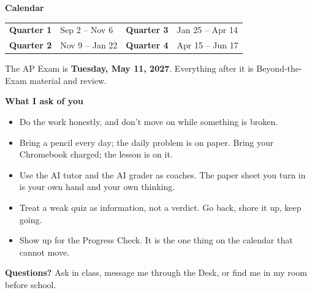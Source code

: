 \documentclass[10pt]{article}
\newcommand{\banner}[1]{%
  \vspace{4pt}\begin{tcolorbox}[enhanced, boxrule=0pt, arc=1pt, colback=dayblue, left=6pt, right=6pt, top=3pt, bottom=3pt]
  {\color{white}\bfseries\large #1}\end{tcolorbox}\vspace{-2pt}}
\begin{document}
\banner{Calendar}
\begin{center}\small
\begin{tabular}{@{}llll@{}}
\toprule
\textbf{Quarter 1} & Sep 2 -- Nov 6 & \textbf{Quarter 3} & Jan 25 -- Apr 14 \\
\textbf{Quarter 2} & Nov 9 -- Jan 22 & \textbf{Quarter 4} & Apr 15 -- Jun 17 \\
\bottomrule
\end{tabular}
\end{center}
The AP Exam is \textbf{Tuesday, May 11, 2027}. Everything after it is Beyond-the-Exam material and review.

\banner{What I ask of you}
\begin{itemize}[leftmargin=1.4em, itemsep=1pt, topsep=2pt]
  \item Do the work honestly, and don't move on while something is broken.
  \item Bring a pencil every day; the daily problem is on paper. Bring your Chromebook charged; the lesson is on it.
  \item Use the AI tutor and the AI grader as coaches. The paper sheet you turn in is your own hand and your own thinking.
  \item Treat a weak quiz as information, not a verdict. Go back, shore it up, keep going.
  \item Show up for the Progress Check. It is the one thing on the calendar that cannot move.
\end{itemize}

\vspace{6pt}
\begin{tcolorbox}[enhanced, colback=warm, colframe=warmred, boxrule=0.6pt, arc=2pt, left=7pt, right=7pt, top=4pt, bottom=4pt]
\small\textbf{Questions?} Ask in class, message me through the Desk, or find me in my room before school.
\end{tcolorbox}
\end{document}
